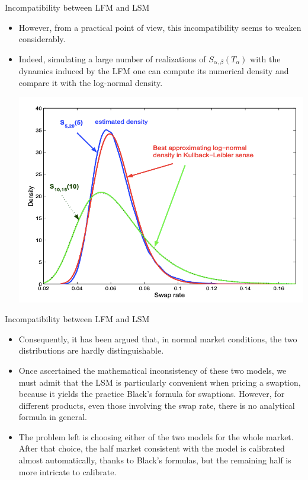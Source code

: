 \documentclass{beamer}
\begin{document}
\begin{frame}{Incompatibility between LFM and LSM}
  \begin{itemize}
  \item<1-> However, from a practical point of view, this incompatibility seems to weaken considerably. 
  \item<2-> Indeed, simulating a large number of realizations of $S_{\alpha,\beta}(T_\alpha)$ with the dynamics induced by the LFM one can compute its numerical density and compare it with the log-normal density. 
  \begin{center}
  	\includegraphics[width=0.45\linewidth]{swap_rate_LFM}
  \end{center}
  \end{itemize}
\end{frame}

\begin{frame}{Incompatibility between LFM and LSM}
	\begin{itemize}
	\item<1-> Consequently, it has been argued that, in normal market conditions, the two distributions are hardly distinguishable.
	\item<2-> Once ascertained the mathematical inconsistency of these two models, we must admit that the LSM is particularly convenient when pricing a swaption, because it yields the practice Black’s formula for swaptions. However, for different products, even those involving the swap rate, there is no analytical formula in general. 
  \item<3-> The problem left is choosing either of the two models for the whole market. After that choice, the half market consistent with the model is calibrated almost automatically, thanks to Black’s formulas, but the remaining half is more intricate to calibrate.
	\end{itemize}
\end{frame}
\end{document}
